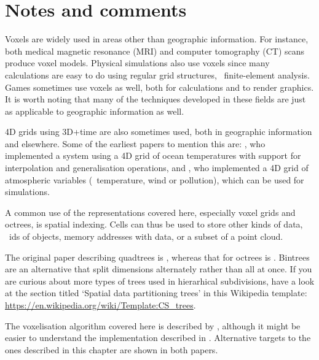 %
\section{Notes and comments}

Voxels are widely used in areas other than geographic information.
For instance, both medical magnetic resonance (MRI) and computer tomography (CT) scans produce voxel models.
Physical simulations also use voxels since many calculations are easy to do using regular grid structures, \eg\ finite-element analysis.
Games sometimes use voxels as well, both for calculations and to render graphics.
It is worth noting that many of the techniques developed in these fields are just as applicable to geographic information as well.

4D grids using 3D+time are also sometimes used, both in geographic information and elsewhere.
Some of the earliest papers to mention this are: \citet{Mason94}, who implemented a system using a 4D grid of ocean temperatures with support for interpolation and generalisation operations, and \citet{Bernard98}, who implemented a 4D grid of atmospheric variables (\eg\ temperature, wind or pollution), which can be used for simulations.

A common use of the representations covered here, especially voxel grids and octrees, is spatial indexing.
Cells can thus be used to store other kinds of data, \eg\ ids of objects, memory addresses with data, or a subset of a point cloud.

The original paper describing quadtrees is \citet{Finkel74}, whereas that for octrees is \citet{Meagher80}.
Bintrees~\citep{Samet85} are an alternative that split dimensions alternately rather than all at once.
If you are curious about more types of trees used in hierarhical subdivisions, have a look at the section titled `Spatial data partitioning trees' in this Wikipedia template: \url{https://en.wikipedia.org/wiki/Template:CS_trees}.

The voxelisation algorithm covered here is described by \citet{Laine13}, although it might be easier to understand the implementation described in \citet{Nourian16}.
Alternative targets to the ones described in this chapter are shown in both papers.
